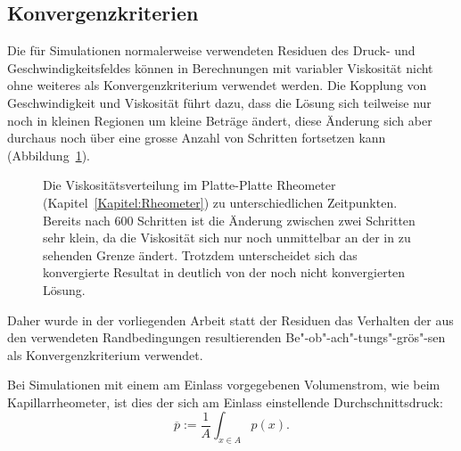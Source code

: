 \subsection{Konvergenzkriterien}
Die für Simulationen normalerweise verwendeten Residuen des Druck- und Geschwindigkeitsfeldes können in Berechnungen mit variabler Viskosität nicht ohne weiteres als Konvergenzkriterium verwendet werden.
Die Kopp\-lung von Geschwindigkeit und Viskosität führt dazu, dass die Lösung sich teilweise nur noch in kleinen Regionen um kleine Beträge ändert, diese Änderung sich aber durchaus noch über eine grosse Anzahl von Schritten fortsetzen kann
(Abbildung~\ref{fig:platRheoNu}).
\begin{figure}
    \centering
    \caption{Die Viskositätsverteilung im Platte-Platte Rheometer (Kapitel~\ref{Kapitel:Rheometer}) zu unterschiedlichen Zeitpunkten. Bereits nach 600 Schritten ist die Änderung zwischen zwei Schritten sehr klein, da die Viskosität sich nur noch unmittelbar an der in  zu sehenden Grenze ändert. Trotzdem unterscheidet sich das konvergierte Resultat in  deutlich von der noch nicht konvergierten Lösung.}
    \label{fig:platRheoNu}
\end{figure}
Daher wurde in der vorliegenden Arbeit statt der Residuen das Verhalten der aus den verwendeten Randbedingungen resultierenden Be"-ob"-ach"-tungs"-grös"-sen als Konvergenzkriterium verwendet.

Bei Simulationen mit einem am Einlass vorgegebenen Volumenstrom, wie beim Kapillarrheometer, ist dies der sich am Einlass einstellende Durchschnittsdruck:
%
\begin{equation}
    \overline p:= \frac{1}{A}\int_{x\in A}p\left( x \right).
\end{equation}
%


